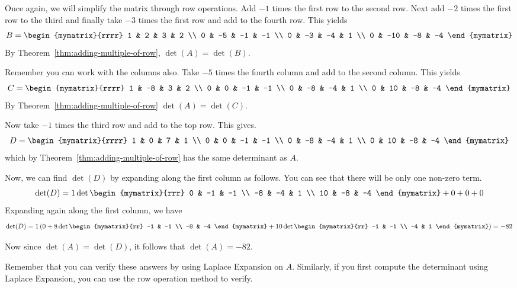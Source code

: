 \begin{solution} 
Once again, we will simplify the matrix through row operations. 
Add $-1$ times the first row to
the second row. Next add $-2$ times the first row to the third and finally take
$-3$ times the first row and add to the fourth row. This yields
\begin{equation*}
B = \begin{mymatrix}{rrrr}
1 & 2 & 3 & 2 \\
0 & -5 & -1 & -1 \\
0 & -3 & -4 & 1 \\
0 & -10 & -8 & -4
\end{mymatrix} 
\end{equation*}
By Theorem~\ref{thm:adding-multiple-of-row}, $\det (A) = \det (B)$. 

Remember you can work with the columns also. Take $-5$
times the fourth column and add to the second column. This yields
\begin{equation*}
C = \begin{mymatrix}{rrrr}
1 & -8 & 3 & 2 \\
0 & 0 & -1 & -1 \\
0 & -8 & -4 & 1 \\
0 & 10 & -8 & -4
\end{mymatrix}
\end{equation*}
By Theorem~\ref{thm:adding-multiple-of-row} $\det (A) = \det (C)$. 

Now take $-1$ times the third row and add to
the top row. This gives.
\begin{equation*}
D = \begin{mymatrix}{rrrr}
1 & 0 & 7 & 1 \\
0 & 0 & -1 & -1 \\
0 & -8 & -4 & 1 \\
0 & 10 & -8 & -4
\end{mymatrix}
\end{equation*}
which by Theorem~\ref{thm:adding-multiple-of-row} has the same determinant as $A$.

Now, we can find $\det (D)$ by expanding along the first column as follows. You can see that there will be only one non-zero term.
\begin{equation*}
\det (D) = 1 \det \begin{mymatrix}{rrr}
0 & -1 & -1 \\
-8 & -4 & 1 \\
10 & -8 & -4
\end{mymatrix}
+ 0 + 0 + 0 
\end{equation*}
Expanding again along the first column, we have
\begin{equation*}
\det (D) 
=
1 \paren{0 +  8\det \begin{mymatrix}{rr}
-1 & -1 \\
-8 & -4
\end{mymatrix} +10\det \begin{mymatrix}{rr}
-1 & -1 \\
-4 & 1
\end{mymatrix}} = -82
\end{equation*}

Now since $\det (A) = \det (D)$, it follows that $\det (A) = -82$. 
\end{solution} 

Remember that you can verify these answers by using Laplace Expansion on $A$. 
Similarly, if you first compute the determinant using Laplace Expansion, you can use the row operation
method to verify.

